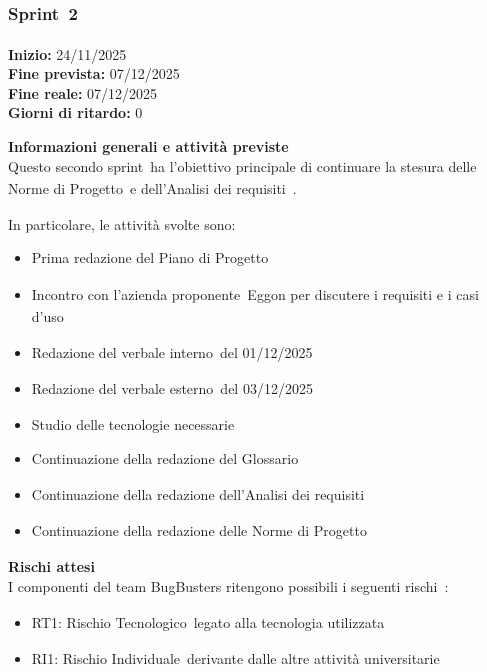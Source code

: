 \documentclass[a4paper,12pt]{article}
\newcommand{\pediceG}{\texorpdfstring{\textsubscript{\scalebox{0.6}{\textbf{G}}}~}{G}}
\begin{document}
\newpage

\subsubsection{Sprint\pediceG 2}

\textbf{Inizio:} 24/11/2025 \\
\textbf{Fine prevista:} 07/12/2025 \\
\textbf{Fine reale:} 07/12/2025 \\
\textbf{Giorni di ritardo:} 0

\noindent\textbf{Informazioni generali e attività previste}\\
Questo secondo sprint\pediceG ha l'obiettivo principale di continuare la stesura delle Norme di Progetto\pediceG e dell'Analisi dei requisiti\pediceG.

In particolare, le attività svolte sono:
\begin{itemize}
    \item Prima redazione del Piano di Progetto\pediceG
    \item Incontro con l'azienda proponente\pediceG Eggon per discutere i requisiti e i casi d'uso\pediceG
    \item Redazione del verbale interno\pediceG del 01/12/2025
    \item Redazione del verbale esterno\pediceG del 03/12/2025
    \item Studio delle tecnologie necessarie
    \item Continuazione della redazione del Glossario\pediceG
    \item Continuazione della redazione dell'Analisi dei requisiti\pediceG
    \item Continuazione della redazione delle Norme di Progetto\pediceG
\end{itemize}

\noindent\textbf{Rischi attesi}\\
I componenti del team BugBusters ritengono possibili i seguenti rischi\pediceG:
\begin{itemize}
    \item RT1: Rischio Tecnologico\pediceG legato alla tecnologia utilizzata
    \item RI1: Rischio Individuale\pediceG derivante dalle altre attività universitarie
\end{itemize}
\end{document}
